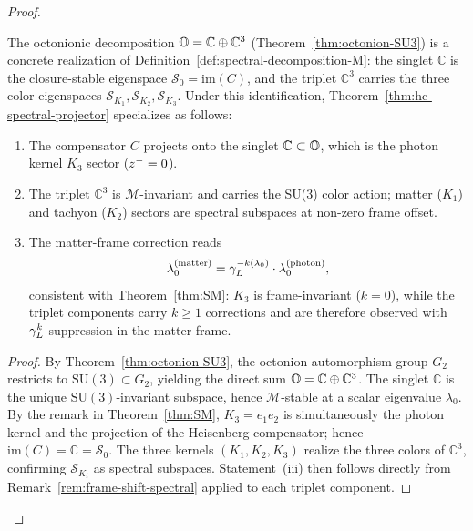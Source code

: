 \begin{proof}
\begin{corollary}
\label{cor:SM-spectral-realization}
The octonionic decomposition $\mathbb{O} = \mathbb{C}\oplus\mathbb{C}^3$
(Theorem~\ref{thm:octonion-SU3}) is a concrete realization of
Definition~\ref{def:spectral-decomposition-M}: the singlet $\mathbb{C}$ is
the closure-stable eigenspace $\mathcal{S}_0 = \mathrm{im}(C)$, and the
triplet $\mathbb{C}^3$ carries the three color eigenspaces
$\mathcal{S}_{K_1},\mathcal{S}_{K_2},\mathcal{S}_{K_3}$.
Under this identification, Theorem~\ref{thm:hc-spectral-projector}
specializes as follows:
\begin{enumerate}[label=(\roman*)]
  \item The compensator $C$ projects onto the singlet $\mathbb{C}\subset\mathbb{O}$,
  which is the photon kernel $K_3$ sector ($z^-=0$).
  \item The triplet $\mathbb{C}^3$ is $\mathcal{M}$-invariant and carries
  the SU(3) color action; matter ($K_1$) and tachyon ($K_2$) sectors are
  spectral subspaces at non-zero frame offset.
  \item The matter-frame correction reads
  \[
    \lambda_0^{(\mathrm{matter})}
    = \gamma_L^{-k(\lambda_0)}\cdot\lambda_0^{(\mathrm{photon})},
  \]
  consistent with Theorem~\ref{thm:SM}: $K_3$ is frame-invariant
  ($k=0$), while the triplet components carry $k\ge 1$ corrections
  and are therefore observed with $\gamma_L^k$-suppression in the matter frame.
\end{enumerate}
\end{corollary}

\begin{proof}
By Theorem~\ref{thm:octonion-SU3}, the octonion automorphism group $G_2$
restricts to $\mathrm{SU}(3)\subset G_2$, yielding the direct sum
$\mathbb{O} = \mathbb{C}\oplus\mathbb{C}^3$. The singlet $\mathbb{C}$ is the
unique $\mathrm{SU}(3)$-invariant subspace, hence $\mathcal{M}$-stable at
a scalar eigenvalue $\lambda_0$. By the remark in
Theorem~\ref{thm:SM}, $K_3 = e_1 e_2$ is simultaneously the photon kernel
and the projection of the Heisenberg compensator; hence
$\mathrm{im}(C) = \mathbb{C} = \mathcal{S}_0$. The three kernels
$(K_1,K_2,K_3)$ realize the three colors of $\mathbb{C}^3$, confirming
$\mathcal{S}_{K_i}$ as spectral subspaces. Statement~(iii) then follows
directly from Remark~\ref{rem:frame-shift-spectral} applied to each
triplet component.
\end{proof}



\end{proof}
